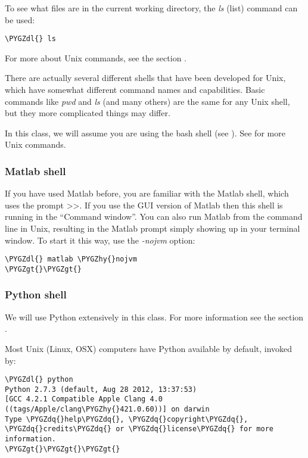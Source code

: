 \documentclass[letterpaper,10pt,english]{sphinxmanual}
\def\PYGZgt{\char`\>}
\def\PYGZdl{\char`\$}
\def\PYGZhy{\char`\-}
\def\PYGZdq{\char`\"}
\begin{document}
To see what files are in the current working directory, the \emph{ls} (list)
command can be used:

\begin{Verbatim}[commandchars=\\\{\}]
\PYGZdl{} ls
\end{Verbatim}

For more about Unix commands, see the section {\hyperref[unix:unix]{}}.

There are actually several different shells that have been developed for
Unix, which have somewhat different command names and capabilities.  Basic
commands like \emph{pwd} and \emph{ls} (and many others) are the same for any Unix
shell, but they more complicated things may differ.

In this class, we will assume you are using the bash shell (see {\hyperref[unix:bash]{}}).
See {\hyperref[unix:unix]{}} for more Unix commands.


\subsubsection{Matlab shell}
\label{shells:matlab-shell}
If you have used Matlab before, you are familiar with the Matlab shell,
which uses the prompt \textgreater{}\textgreater{}.  If you use the GUI version of Matlab then this
shell is running in the ``Command window''.  You can also run Matlab from the
command line in Unix, resulting in the Matlab prompt simply showing up in
your terminal window.  To start it this way, use the \emph{-nojvm} option:

\begin{Verbatim}[commandchars=\\\{\}]
\PYGZdl{} matlab \PYGZhy{}nojvm
\PYGZgt{}\PYGZgt{}
\end{Verbatim}


\subsubsection{Python shell}
\label{shells:python-shell}
We will use Python extensively in this class.  For more information see the
section {\hyperref[python:python]{}}.

Most Unix (Linux, OSX) computers have Python available by default, invoked by:

\begin{Verbatim}[commandchars=\\\{\}]
\PYGZdl{} python
Python 2.7.3 (default, Aug 28 2012, 13:37:53)
[GCC 4.2.1 Compatible Apple Clang 4.0 ((tags/Apple/clang\PYGZhy{}421.0.60))] on darwin
Type \PYGZdq{}help\PYGZdq{}, \PYGZdq{}copyright\PYGZdq{}, \PYGZdq{}credits\PYGZdq{} or \PYGZdq{}license\PYGZdq{} for more information.
\PYGZgt{}\PYGZgt{}\PYGZgt{}
\end{Verbatim}
\end{document}
